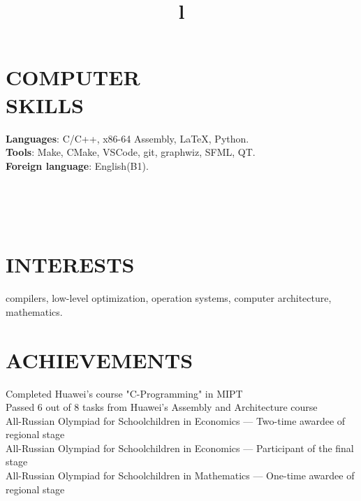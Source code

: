 \documentclass[margin]{res}
\begin{document}
\begin{resume}

\section{COMPUTER\\SKILLS}

\textbf{Languages}: C/C++, x86-64 Assembly, \LaTeX, Python.
\\
\textbf{Tools}: Make, CMake, VSCode, git, graphwiz, SFML, QT.
\\
\textbf{Foreign language}: English(B1).

\begin{format}
\title{l}\\
\\
\body\\
\end{format}
\section{INTERESTS}
compilers, low-level optimization, operation systems, computer architecture, mathematics.
\section{ACHIEVEMENTS}
Completed Huawei's course "C-Programming" in MIPT \\
Passed 6 out of 8 tasks from Huawei's Assembly and Architecture course \\
All-Russian Olympiad for Schoolchildren in Economics --- Two-time awardee of regional stage \\
All-Russian Olympiad for Schoolchildren in Economics --- Participant of the final stage \\
All-Russian Olympiad for Schoolchildren in Mathematics --- One-time awardee of regional stage \\
\end{resume}
\end{document}
